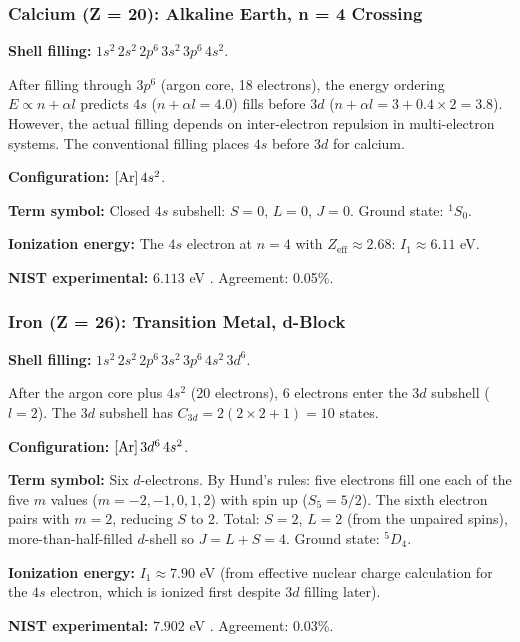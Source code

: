 \documentclass[11pt,twocolumn,a4paper]{article}
\theoremstyle{definition}
\theoremstyle{remark}
\begin{document}
\subsubsection{Calcium (Z = 20): Alkaline Earth, n = 4 Crossing}

\textbf{Shell filling:} $1s^2\,2s^2\,2p^6\,3s^2\,3p^6\,4s^2$.

After filling through $3p^6$ (argon core, 18 electrons), the energy ordering $E \propto n + \alpha l$ predicts $4s$ ($n + \alpha l = 4.0$) fills before $3d$ ($n + \alpha l = 3 + 0.4 \times 2 = 3.8$). However, the actual filling depends on inter-electron repulsion in multi-electron systems. The conventional filling places $4s$ before $3d$ for calcium.

\textbf{Configuration:} $[{\rm Ar}]\,4s^2$.

\textbf{Term symbol:} Closed $4s$ subshell: $S = 0$, $L = 0$, $J = 0$. Ground state: ${}^1S_0$.

\textbf{Ionization energy:} The $4s$ electron at $n = 4$ with $Z_{\mathrm{eff}} \approx 2.68$: $I_1 \approx 6.11$ eV.

\textbf{NIST experimental:} $6.113$ eV \citep{nist_asd}. Agreement: 0.05\%.

\subsubsection{Iron (Z = 26): Transition Metal, d-Block}

\textbf{Shell filling:} $1s^2\,2s^2\,2p^6\,3s^2\,3p^6\,4s^2\,3d^6$.

After the argon core plus $4s^2$ (20 electrons), 6 electrons enter the $3d$ subshell ($l = 2$). The $3d$ subshell has $C_{3d} = 2(2 \times 2 + 1) = 10$ states.

\textbf{Configuration:} $[{\rm Ar}]\,3d^6\,4s^2$.

\textbf{Term symbol:} Six $d$-electrons. By Hund's rules: five electrons fill one each of the five $m$ values ($m = -2, -1, 0, 1, 2$) with spin up ($S_{5} = 5/2$). The sixth electron pairs with $m = 2$, reducing $S$ to 2. Total: $S = 2$, $L = 2$ (from the unpaired spins), more-than-half-filled $d$-shell so $J = L + S = 4$. Ground state: ${}^5D_4$.

\textbf{Ionization energy:} $I_1 \approx 7.90$ eV (from effective nuclear charge calculation for the $4s$ electron, which is ionized first despite $3d$ filling later).

\textbf{NIST experimental:} $7.902$ eV \citep{nist_asd}. Agreement: 0.03\%.
\end{document}
